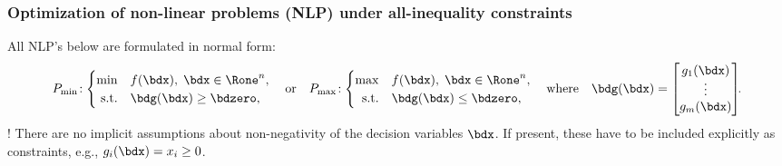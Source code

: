 \documentclass[a4paper]{article}
\begin{document}
\subsubsection*{Optimization of non-linear problems (NLP) under all-inequality constraints}%

  All NLP's below are formulated in normal form:
  \[
    P_{\min}\!:
    \begin{cases}
      \min        & f(\bdx),\; \bdx\in\Rone^n, \\
      \hfill
      \text{s.t.} & \bdg(\bdx)\ge\bdzero,
    \end{cases}
    \quad
    \text{or}
    \quad
    P_{\max}\!:
    \begin{cases}
      \max        & f(\bdx),\; \bdx\in\Rone^n, \\
      \hfill
      \text{s.t.} & \bdg(\bdx)\le\bdzero,
    \end{cases}
    \quad
    \text{where}
    \quad
    \bdg(\bdx)
    =
    \begin{bmatrix}
      g_1(\bdx)\\[-2pt] \vdots\\ g_m(\bdx)
    \end{bmatrix}
    \mkern-6mu.
  \]
 \Obs! There are no implicit assumptions about non-negativity of the decision variables $\bdx$.
 If present, these have to be included explicitly as constraints, e.g., $g_i(\bdx)=x_i\ge0$.
\end{document}
